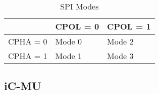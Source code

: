 \begin{table}[hp]
    \begin{tabular}{|l|l|l|}
        \hline
                    & CPOL = 0  & CPOL = 1     \\ \hline
        CPHA = 0    & Mode 0    & Mode 2    \\ \hline
        CPHA = 1    & Mode 1    & Mode 3    \\ \hline
    \end{tabular}
    \caption{SPI Modes}
    \label{tab:spi_modes}
\end{table}

\subsection{iC-MU}
%